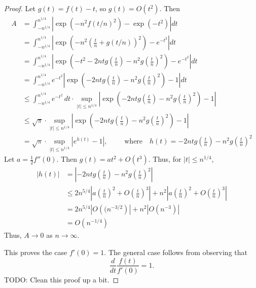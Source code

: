 \documentclass[reqno]{amsart}
\begin{document}
\begin{proof}
    Let $g(t) = f(t) - t$, so $g(t) = O(t^2)$.
    Then
    \begin{align*}
        A
        &=
        \int_{-n^{1/4}}^{n^{1/4}}\left|
        \exp\left(
        -n^2 f(t/n)^2 \right)
        - \exp\left(-t^2\right)\right|dt
        \\&=
        \int_{-n^{1/4}}^{n^{1/4}}\left|
        \exp\left(-n^2\left(
        \frac{t}{n} + g(t/n)\right)^2\right)
        - e^{-t^2}\right|dt
        \\&=
        \int_{-n^{1/4}}^{n^{1/4}}\left|
        \exp\left(-t^2-2ntg\left(\frac{t}{n}\right)
        -n^2g\left(\frac{t}{n}\right)^2\right)
        - e^{-t^2}\right|dt
        \\&=
        \int_{-n^{1/4}}^{n^{1/4}}
        e^{-t^2}\left|
        \exp\left(-2ntg\left(\frac{t}{n}\right)
        -n^2g\left(\frac{t}{n}\right)^2\right)
        - 1\right|dt
        \\&\leq
        \int_{-n^{1/4}}^{n^{1/4}}
        e^{-t^2}\, dt \cdot
        \sup_{|t| \leq n^{1/4}}\left|
        \exp\left(-2ntg\left(\frac{t}{n}\right)
        -n^2g\left(\frac{t}{n}\right)^2\right)
        - 1\right|
        \\&\leq
        \sqrt{\pi} \cdot 
        \sup_{|t| \leq n^{1/4}}\left|
        \exp\left(-2ntg\left(\frac{t}{n}\right)
        -n^2g\left(\frac{t}{n}\right)^2\right)
        - 1\right|
        \\&=
        \sqrt{\pi} \cdot 
        \sup_{|t| \leq n^{1/4}}\left|
        e^{h(t)}
        - 1\right|,
        \qquad \text{ where} \quad
        h(t) = -2ntg\left(\frac{t}{n}\right)
        -n^2g\left(\frac{t}{n}\right)^2
    \end{align*}
    Let $a = \frac12 f''(0)$.
    Then $g(t) = at^2 + O(t^3)$.
    Thus, for $|t| \leq n^{1/4}$,
    \begin{align*}
        |h(t)|
        &=
        \left| -2ntg\left(\frac{t}{n}\right)
        -n^2g\left(\frac{t}{n}\right)^2 \right|
        \\&\leq
        2n^{5/4}\left|
        a\left(\frac{t}{n}\right)^2
        + O\left(\frac{t}{n}\right)^3
        \right|
        + n^2 \left|
        a\left(\frac{t}{n}\right)^2
        + O\left(\frac{t}{n}\right)^3
        \right|
        \\&=
        2n^{5/4}\left|
        O\left((n^{-3/2}\right)
        \right|
        + n^2 \left|
        O\left(n^{-3}\right)
        \right|
        \\&=
        O\left(n^{-1/4}\right)
    \end{align*}
    Thus, $A \to 0$ as $n \to \infty$.
    
    This proves the case $f'(0)=1$.
    The general case follows from observing that 
    \[
    \frac{d}{dt}
    \frac{f(t)}{f'(0)} = 1.
    \]
    TODO: Clean this proof up a bit.
\end{proof}
\end{document}
